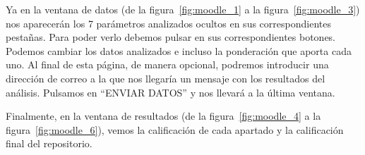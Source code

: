 \documentclass[a4paper, 12pt]{book}
\begin{document}
Ya en la ventana de datos (de la figura~\ref{fig:moodle_1} a la figura~\ref{fig:moodle_3}) nos aparecerán los 7 parámetros analizados ocultos en sus correspondientes pestañas. Para poder verlo debemos pulsar en sus correspondientes botones. Podemos cambiar los datos analizados e incluso la ponderación que aporta cada uno. Al final de esta página, de manera opcional, podremos introducir una dirección de correo a la que nos llegaría un mensaje con los resultados del análisis. Pulsamos en ``ENVIAR DATOS'' y nos llevará a la última ventana.

Finalmente, en la ventana de resultados (de la figura~\ref{fig:moodle_4} a la figura~\ref{fig:moodle_6}), vemos la calificación de cada apartado y la calificación final del repositorio.


\cleardoublepage


\end{document}
